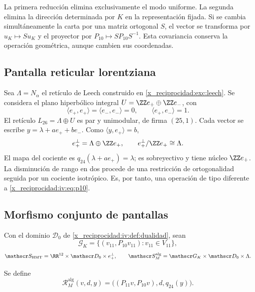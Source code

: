 La primera reducción elimina exclusivamente el modo uniforme.
La segunda elimina la dirección determinada por \(K\) en
la representación fijada. Si se cambia simultáneamente la carta
por una matriz ortogonal \(S\), el vector se transforma por
\(u_K\mapsto Su_K\) y el proyector por
\(P_{10}\mapsto SP_{10}S^{-1}\). Esta covariancia conserva
la operación geométrica, aunque cambien sus coordenadas.

\subsection{Pantalla reticular lorentziana}

Sea \(\Lambda=N_\alpha\) el retículo de Leech construido
en \ref{x_reciprocidad:exc:leech}. Se considera el plano hiperbólico integral
\(U=\ZZ e_+\oplus\ZZ e_-\), con
\[
 \langle e_+,e_+\rangle=\langle e_-,e_-\rangle=0,
 \qquad\langle e_+,e_-\rangle=1.
\]
El retículo \(L_{26}=\Lambda\oplus U\) es par y
unimodular, de firma \((25,1)\). Cada vector se escribe
\(y=\lambda+ae_++be_-\). Como
\(\langle y,e_+\rangle=b\),
\begin{equation}
 e_+^\perp=\Lambda\oplus\ZZ e_+,
 \qquad e_+^\perp/\ZZ e_+\cong\Lambda.
 \label{x_reciprocidad:iv:eq:26-24}
\end{equation}
El mapa del cociente es
\(q_{24}(\lambda+ae_+)=\lambda\); es sobreyectivo y tiene
núcleo \(\ZZ e_+\). La disminución de rango en dos procede
de una restricción de ortogonalidad seguida por un cociente
isotrópico. Es, por tanto, una operación de tipo diferente a
\eqref{x_reciprocidad:iv:eq:p10}.

\subsection{Morfismo conjunto de pantallas}

Con el dominio \(\mathscr D_0\) de \ref{x_reciprocidad:iv:def:dualidad},
sean
\[
 \mathscr G_K=\{(v_{11},P_{10}v_{11}):v_{11}\in V_{11}\},
\]
\[
 \mathscr S_{\mathrm{HMT}}=\RR^{12}\times\mathscr D_0\times e_+^\perp,
 \qquad
 \mathscr S_M^{\mathrm{alg}}=\mathscr G_K\times\mathscr D_0\times\Lambda.
\]
\begin{definition}
\label{x_reciprocidad:iv:def:rm-alg}
Se define
\begin{equation}
 \mathcal R_M^{\mathrm{alg}}(v,d,y)
 =\bigl((P_{11}v,P_{10}v),d,q_{24}(y)\bigr).
 \label{x_reciprocidad:iv:eq:rm-alg}
\end{equation}
\end{definition}

